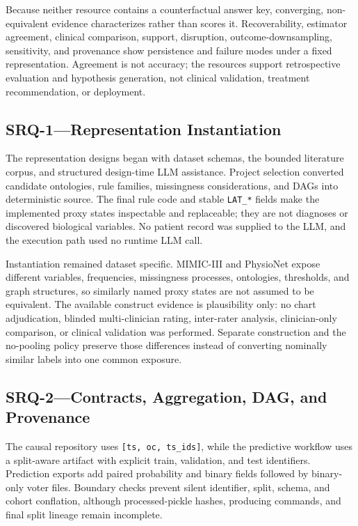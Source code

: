 Because neither resource contains a counterfactual answer key, converging, non-equivalent evidence characterizes rather than scores it.  Recoverability, estimator agreement, clinical comparison, support, disruption, outcome-downsampling, sensitivity, and provenance show persistence and failure modes under a fixed representation.  Agreement is not accuracy; the resources support retrospective evaluation and hypothesis generation, not clinical validation, treatment recommendation, or deployment.

\subsection{SRQ-1---Representation Instantiation}
\label{subsec:discussion:data-contracts-integration}

The representation designs began with dataset schemas, the bounded literature corpus, and structured design-time LLM assistance.  Project selection converted candidate ontologies, rule families, missingness considerations, and DAGs into deterministic source.  The final rule code and stable \texttt{LAT\_*} fields make the implemented proxy states inspectable and replaceable; they are not diagnoses or discovered biological variables.  No patient record was supplied to the LLM, and the execution path used no runtime LLM call.

Instantiation remained dataset specific.  MIMIC-III and PhysioNet expose different variables, frequencies, missingness processes, ontologies, thresholds, and graph structures, so similarly named proxy states are not assumed to be equivalent.  The available construct evidence is plausibility only: no chart adjudication, blinded multi-clinician rating, inter-rater analysis, clinician-only comparison, or clinical validation was performed.  Separate construction and the no-pooling policy preserve those differences instead of converting nominally similar labels into one common exposure.

\subsection{SRQ-2---Contracts, Aggregation, DAG, and Provenance}
\label{subsec:discussion:proxy-prediction-aggregation}

The causal repository uses \texttt{[ts, oc, ts\_ids]}, while the predictive workflow uses a split-aware artifact with explicit train, validation, and test identifiers.  Prediction exports add paired probability and binary fields followed by binary-only voter files.  Boundary checks prevent silent identifier, split, schema, and cohort conflation, although processed-pickle hashes, producing commands, and final split lineage remain incomplete.


